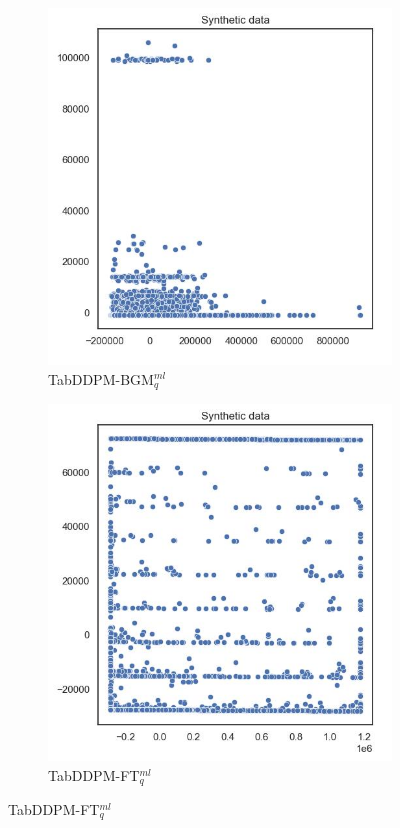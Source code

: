 \begin{figure}[H]
	\centering
	\begin{subfigure}{0.3\textwidth}
		\centering
		\includegraphics[width=\textwidth]{images/pca/tab-ddpm-bgm.jpg}
		\caption{TabDDPM-BGM$^{ml}_q$}
	\end{subfigure}
	\begin{subfigure}{0.3\textwidth}
		\centering
		\includegraphics[width=\textwidth]{images/pca/tab-ddpm-ft.jpg}
		\caption{TabDDPM-FT$^{ml}_q$}
	\end{subfigure}



\end{figure}
